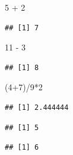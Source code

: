 \documentclass[]{book}
\newenvironment{Shaded}{\begin{snugshade}}{\end{snugshade}}
\newcommand{\DecValTok}[1]{\textcolor[rgb]{0.69,0.50,0.00}{#1}}
\newcommand{\StringTok}[1]{\textcolor[rgb]{0.75,0.01,0.01}{#1}}
\newcommand{\OperatorTok}[1]{\textcolor[rgb]{0.12,0.11,0.11}{#1}}
\newcommand{\NormalTok}[1]{\textcolor[rgb]{0.12,0.11,0.11}{#1}}
\theoremstyle{definition}
\theoremstyle{definition}
\theoremstyle{definition}
\theoremstyle{remark}
\begin{document}
\begin{Shaded}
\begin{Highlighting}[]
\DecValTok{5} \OperatorTok{+}\StringTok{ }\DecValTok{2}
\end{Highlighting}
\end{Shaded}

\begin{verbatim}
## [1] 7
\end{verbatim}

\begin{Shaded}
\begin{Highlighting}[]
\DecValTok{11} \OperatorTok{-}\StringTok{ }\DecValTok{3}
\end{Highlighting}
\end{Shaded}

\begin{verbatim}
## [1] 8
\end{verbatim}

\begin{Shaded}
\begin{Highlighting}[]
\NormalTok{(}\DecValTok{4}\OperatorTok{+}\DecValTok{7}\NormalTok{)}\OperatorTok{/}\DecValTok{9}\OperatorTok{*}\DecValTok{2}
\end{Highlighting}
\end{Shaded}

\begin{verbatim}
## [1] 2.444444
\end{verbatim}

\begin{Shaded}
\end{Shaded}

\begin{verbatim}
## [1] 5
\end{verbatim}

\begin{Shaded}
\end{Shaded}

\begin{verbatim}
## [1] 6
\end{verbatim}
\end{document}
